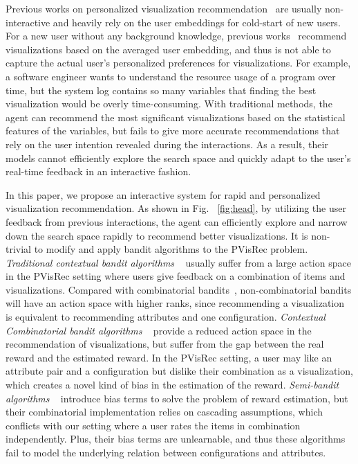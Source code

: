 Previous works on personalized visualization recommendation~\cite{ojo_visgnn_2022,qian_personalized_2021,mutlu_vizrec_2016,vartak2015seedb} are usually non-interactive and heavily rely on the user embeddings for cold-start of new users. For a new user without any background knowledge, previous works~\cite{ML-based-Vis-Rec,qian_personalized_2021} recommend visualizations based on the averaged user embedding, and thus is not able to capture the actual user's personalized preferences for visualizations.
For example, a software engineer wants to understand the resource usage of a program over time, but the system log contains so many variables that finding the best visualization would be overly time-consuming. With traditional methods, the agent can recommend the most significant visualizations based on the statistical features of the variables, but fails to give more accurate recommendations that rely on the user intention revealed during the interactions. As a result, their models cannot efficiently explore the search space and quickly adapt to the user's real-time feedback in an interactive fashion. 


In this paper, we propose an interactive system for rapid and personalized visualization recommendation.
As shown in Fig. ~\ref{fig:head}, by utilizing the user feedback from previous interactions, the agent can efficiently explore and narrow down the search space rapidly to recommend better visualizations. It is non-trivial to modify and apply bandit algorithms to the PVisRec problem.
\textit{Traditional contextual bandit algorithms} ~\cite{chu2011contextual,li2010contextual} usually suffer from a large action space in the PVisRec setting where users give feedback on a combination of items and visualizations. Compared with combinatorial bandits~\cite{qin_contextual_2014}, non-combinatorial bandits will have an action space with higher ranks, since recommending a visualization is equivalent to recommending attributes and one configuration. 
\textit{Contextual Combinatorial bandit algorithms} ~\cite{qin_contextual_2014, dong2022combinatorial} provide a reduced action space in the recommendation of visualizations, but suffer from the gap between the real reward and the estimated reward. In the PVisRec setting, a user may like an attribute pair and a configuration but dislike their combination as a visualization, which creates a novel kind of bias in the estimation of the reward. 
\textit{Semi-bandit algorithms} ~\cite{li2016contextual,peng2019practical} introduce bias terms to solve the problem of reward estimation, but their combinatorial implementation relies on cascading assumptions, which conflicts with our setting where a user rates the items in combination independently. Plus, their bias terms are unlearnable, and thus these algorithms fail to model the underlying relation between configurations and attributes.

